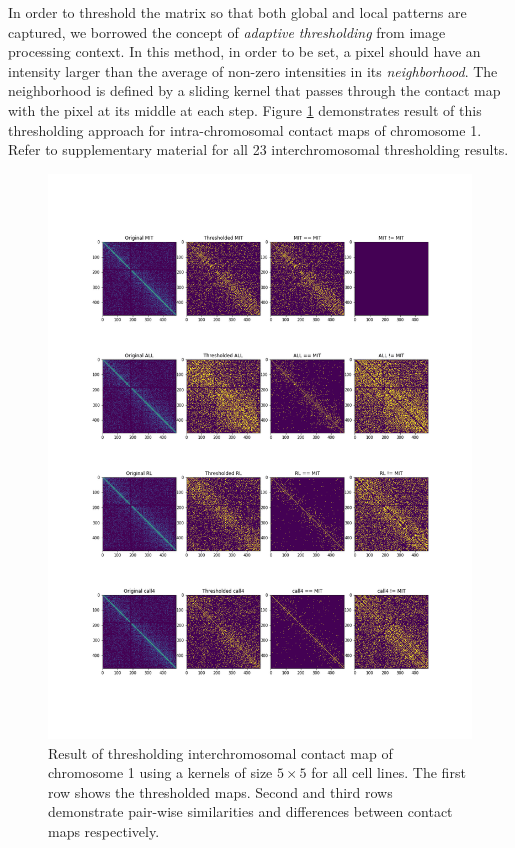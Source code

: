 \documentclass[a4,center,fleqn]{NAR}
\begin{document}
In order to threshold the matrix so that both global and local patterns are
captured, we borrowed the concept of \textit{adaptive thresholding} from image 
processing context. In this method, in order to be set, a pixel should have
an intensity larger than the average of non-zero intensities in its
\textit{neighborhood}. The neighborhood is defined by a sliding kernel 
that passes through the contact map with the pixel at its middle at 
each step. Figure \ref{local_thresholded_chr1_chr1} demonstrates result of 
this thresholding approach for intra-chromosomal contact maps of chromosome 1.
Refer to supplementary material for all 23 interchromosomal thresholding
results.
\begin{figure}[t]
    \centering
    \includegraphics[width=.5\textwidth]{figures/local_thresholded_chr1_chr1.png}
    \caption{Result of thresholding interchromosomal contact map of chromosome 1
    using a kernels of size $5 \times 5$ for all cell lines. 
    The first row shows the thresholded
    maps. Second and third rows demonstrate pair-wise similarities and 
    differences between contact maps respectively.}
    \label{local_thresholded_chr1_chr1}
\end{figure}
\end{document}
